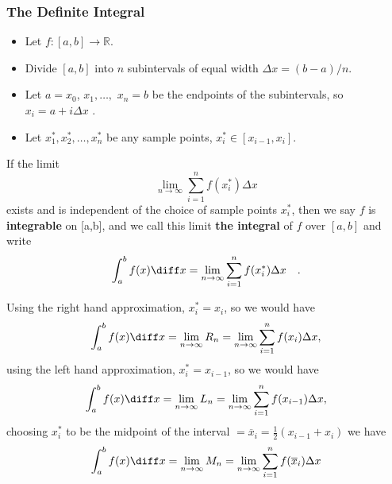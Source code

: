 \begin{frame}\frametitle{ %
The Definite Integral}
\begin{definition}
\begin{itemize}
\item  Let $f:[a,b]\to {\mathbb{R}}$.
\item  Divide $[a,b]$ into $n$ subintervals of equal width $\Delta x = (b-a)/n$.
\item  Let $a=x_0$, $x_1,\ldots ,$ $x_n=b $ be the endpoints of the subintervals, so $ x_i=a+i\Delta x $ .
\item  Let $x_1^*, x_2^*, \ldots , x_n^*$ be any sample points, $x_i^*\in [x_{i-1},x_i]$.  
\end{itemize}
\pause 
\abovedisplayskip=0pt
\belowdisplayskip=0pt
If the limit \[\lim\limits_{n\to \infty} \sum\limits_{i=1}^n f(x_i^*)\Delta x\] 
exists and is independent of the choice of sample points $x_i^*$, then we say $ f $ is \textbf{integrable} on [a,b], and we call this limit \textbf{the integral} of $f$ over $[a,b]$ and write
\[
\int_a^b f(x) \diff x = \lim_{n\to \infty} \sum_{i=1}^n f(x_i^*)\Delta x \quad .
\]
\end{definition}
\end{frame}

\begin{frame}
\begin{definition}
Using the right hand approximation, $ x_i^*=x_i $, so we would have 
\[
\int_a^b{f(x)}  \diff x = \lim_{n\to \infty} R_n  = \lim_{n\to \infty} \sum_{i=1}^n f(x_i)\Delta x,
\]\pause
using the left hand approximation, $ x_i^*=x_{i-1} $, so we would have 
\[
\int_a^b{f(x)}  \diff x = \lim_{n\to \infty} L_n  = \lim_{n\to \infty} \sum_{i=1}^n f(x_{i-1})\Delta x,
\]
\pause
choosing $ x_i^*$ to be the midpoint of the interval $ =\overline{x}_i=\frac{1}{2}(x_{i-1}+x_i)$  we have
\[
\int_a^b f(x)\diff x =\lim_{n\to \infty}M_n=\lim_{n\to \infty} \sum_{i=1}^n f(\overline{x}_i)\Delta x
\]

\end{definition}
\end{frame}

